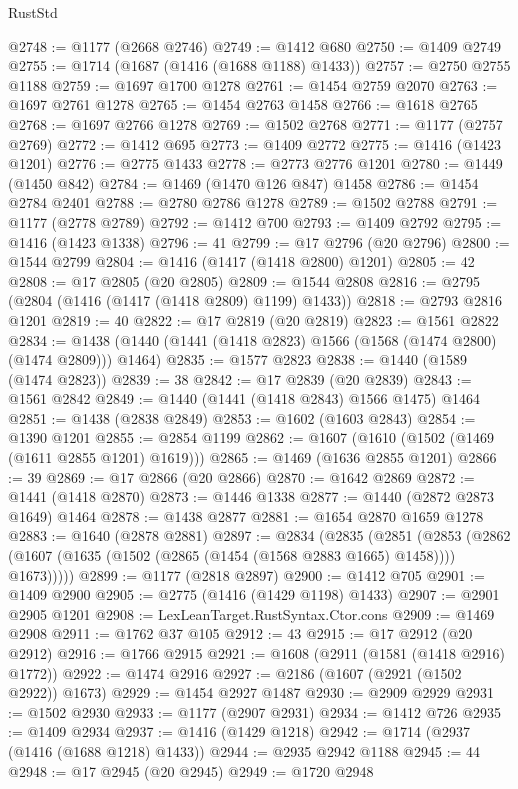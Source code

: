 \begin{lexlean}{RustStd}
\begin{coremodule}
@2748 := @1177 (@2668 @2746)
@2749 := @1412 @680
@2750 := @1409 @2749
@2755 := @1714 (@1687 (@1416 (@1688 @1188) @1433))
@2757 := @2750 @2755 @1188
@2759 := @1697 @1700 @1278
@2761 := @1454 @2759 @2070
@2763 := @1697 @2761 @1278
@2765 := @1454 @2763 @1458
@2766 := @1618 @2765
@2768 := @1697 @2766 @1278
@2769 := @1502 @2768
@2771 := @1177 (@2757 @2769)
@2772 := @1412 @695
@2773 := @1409 @2772
@2775 := @1416 (@1423 @1201)
@2776 := @2775 @1433
@2778 := @2773 @2776 @1201
@2780 := @1449 (@1450 @842)
@2784 := @1469 (@1470 @126 @847) @1458
@2786 := @1454 @2784 @2401
@2788 := @2780 @2786 @1278
@2789 := @1502 @2788
@2791 := @1177 (@2778 @2789)
@2792 := @1412 @700
@2793 := @1409 @2792
@2795 := @1416 (@1423 @1338)
@2796 := 41
@2799 := @17 @2796 (@20 @2796)
@2800 := @1544 @2799
@2804 := @1416 (@1417 (@1418 @2800) @1201)
@2805 := 42
@2808 := @17 @2805 (@20 @2805)
@2809 := @1544 @2808
@2816 := @2795 (@2804 (@1416 (@1417 (@1418 @2809) @1199) @1433))
@2818 := @2793 @2816 @1201
@2819 := 40
@2822 := @17 @2819 (@20 @2819)
@2823 := @1561 @2822
@2834 := @1438 (@1440 (@1441 (@1418 @2823) @1566 (@1568 (@1474 @2800) (@1474 @2809))) @1464)
@2835 := @1577 @2823
@2838 := @1440 (@1589 (@1474 @2823))
@2839 := 38
@2842 := @17 @2839 (@20 @2839)
@2843 := @1561 @2842
@2849 := @1440 (@1441 (@1418 @2843) @1566 @1475) @1464
@2851 := @1438 (@2838 @2849)
@2853 := @1602 (@1603 @2843)
@2854 := @1390 @1201
@2855 := @2854 @1199
@2862 := @1607 (@1610 (@1502 (@1469 (@1611 @2855 @1201) @1619)))
@2865 := @1469 (@1636 @2855 @1201)
@2866 := 39
@2869 := @17 @2866 (@20 @2866)
@2870 := @1642 @2869
@2872 := @1441 (@1418 @2870)
@2873 := @1446 @1338
@2877 := @1440 (@2872 @2873 @1649) @1464
@2878 := @1438 @2877
@2881 := @1654 @2870 @1659 @1278
@2883 := @1640 (@2878 @2881)
@2897 := @2834
    (@2835
      (@2851
        (@2853 (@2862 (@1607 (@1635 (@1502 (@2865 (@1454 (@1568 @2883 @1665) @1458)))) @1673)))))
@2899 := @1177 (@2818 @2897)
@2900 := @1412 @705
@2901 := @1409 @2900
@2905 := @2775 (@1416 (@1429 @1198) @1433)
@2907 := @2901 @2905 @1201
@2908 := LexLeanTarget.RustSyntax.Ctor.cons
@2909 := @1469 @2908
@2911 := @1762 @37 @105
@2912 := 43
@2915 := @17 @2912 (@20 @2912)
@2916 := @1766 @2915
@2921 := @1608 (@2911 (@1581 (@1418 @2916) @1772))
@2922 := @1474 @2916
@2927 := @2186 (@1607 (@2921 (@1502 @2922)) @1673)
@2929 := @1454 @2927 @1487
@2930 := @2909 @2929
@2931 := @1502 @2930
@2933 := @1177 (@2907 @2931)
@2934 := @1412 @726
@2935 := @1409 @2934
@2937 := @1416 (@1429 @1218)
@2942 := @1714 (@2937 (@1416 (@1688 @1218) @1433))
@2944 := @2935 @2942 @1188
@2945 := 44
@2948 := @17 @2945 (@20 @2945)
@2949 := @1720 @2948

\end{coremodule}
\end{lexlean}
